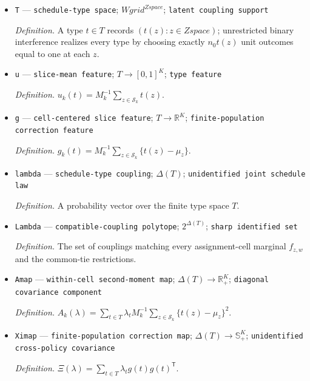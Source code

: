 \documentclass{article}
\begin{document}
\begin{itemize}
  \par\smallskip\noindent\emph{Definition.} The root-\(C\) local displacement of the exact-slice welfare vector from the common tie.
  \item \texttt{T} --- \texttt{schedule-\allowbreak{}type space}; \(Wgrid^{Zspace}\); \texttt{latent coupling support}
  \par\smallskip\noindent\emph{Definition.} A type \(t\in T\) records \((t(z):z\in Zspace)\); unrestricted binary interference realizes every type by choosing exactly \(n_0t(z)\) unit outcomes equal to one at each \(z\).
  \item \texttt{u} --- \texttt{slice-\allowbreak{}mean feature}; \(T\to[0,1]^K\); \texttt{type feature}
  \par\smallskip\noindent\emph{Definition.} \(u_k(t)=M_k^{-1}\sum_{z\in\mathcal S_k}t(z)\).
  \item \texttt{g} --- \texttt{cell-\allowbreak{}centered slice feature}; \(T\to\mathbb R^K\); \texttt{finite-\allowbreak{}population correction feature}
  \par\smallskip\noindent\emph{Definition.} \(g_k(t)=M_k^{-1}\sum_{z\in\mathcal S_k}\{t(z)-\mu_z\}\).
  \item \texttt{lambda} --- \texttt{schedule-\allowbreak{}type coupling}; \(\Delta(T)\); \texttt{unidentified joint schedule law}
  \par\smallskip\noindent\emph{Definition.} A probability vector over the finite type space \(T\).
  \item \texttt{Lambda} --- \texttt{compatible-\allowbreak{}coupling polytope}; \(2^{\Delta(T)}\); \texttt{sharp identified set}
  \par\smallskip\noindent\emph{Definition.} The set of couplings matching every assignment-cell marginal \(f_{z,w}\) and the common-tie restrictions.
  \item \texttt{Amap} --- \texttt{within-\allowbreak{}cell second-\allowbreak{}moment map}; \(\Delta(T)\to\mathbb R_+^K\); \texttt{diagonal covariance component}
  \par\smallskip\noindent\emph{Definition.} \(A_k(\lambda)=\sum_{t\in T}\lambda_t M_k^{-1}\sum_{z\in\mathcal S_k}\{t(z)-\mu_z\}^2\).
  \item \texttt{Ximap} --- \texttt{finite-\allowbreak{}population correction map}; \(\Delta(T)\to\mathbb S_+^K\); \texttt{unidentified cross-\allowbreak{}policy covariance}
  \par\smallskip\noindent\emph{Definition.} \(\Xi(\lambda)=\sum_{t\in T}\lambda_t g(t)g(t)^{\mathsf T}\).

\end{itemize}
\end{document}
